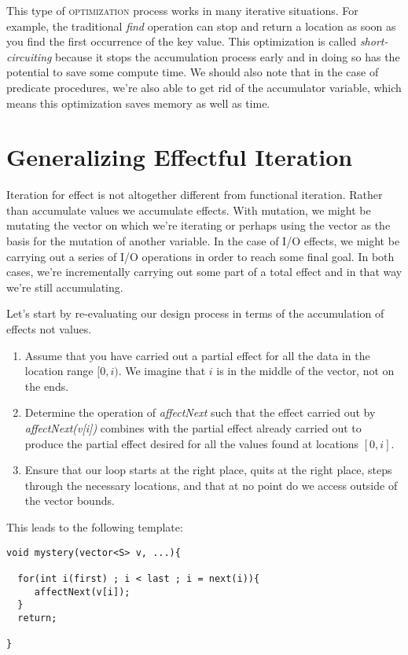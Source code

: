\documentclass[]{tufte-handout}
\begin{document}
This type of \textsc{optimization} process works in many iterative situations. For example, the traditional \textit{find} operation can stop and return a location as soon as you find the first occurrence of the key value. This optimization is called \textit{short-circuiting} because it stops the accumulation process early and in doing so has the potential to save some compute time. We should also note that in the case of predicate procedures, we're also able to get rid of the accumulator variable, which means this optimization saves memory as well as time.

\section{Generalizing Effectful Iteration}

Iteration for effect is not altogether different from functional iteration. Rather than accumulate values we accumulate effects. With mutation, we might be mutating the vector on which we're iterating or perhaps using the vector as the basis for the mutation of another variable. In the case of I/O effects, we might be carrying out a series of I/O operations in order to reach some final goal. In both cases, we're incrementally carrying out some part of a total effect and in that way we're still accumulating.  

Let's start by re-evaluating our design process in terms of the accumulation of effects not values.
\begin{enumerate}
\item Assume that you have carried out a partial effect for all the data in the location range $[0,i)$. We imagine that $i$ is in the middle of the vector, not on the ends.
\item Determine the operation of \textit{affectNext} such that the effect carried out by \textit{affectNext(v[i])} combines with the partial effect already carried out to produce the partial effect desired for all the values found at locations $[0,i]$. 
\item Ensure that our loop starts at the right place, quits at the right place, steps through the necessary locations, and that at no point do we access outside of the vector bounds.
\end{enumerate}


This leads to the following template:
\begin{verbatim}
void mystery(vector<S> v, ...){
  
  for(int i(first) ; i < last ; i = next(i)){
     affectNext(v[i]);  
  } 
  return;
 
} 
\end{verbatim}
\end{document}
